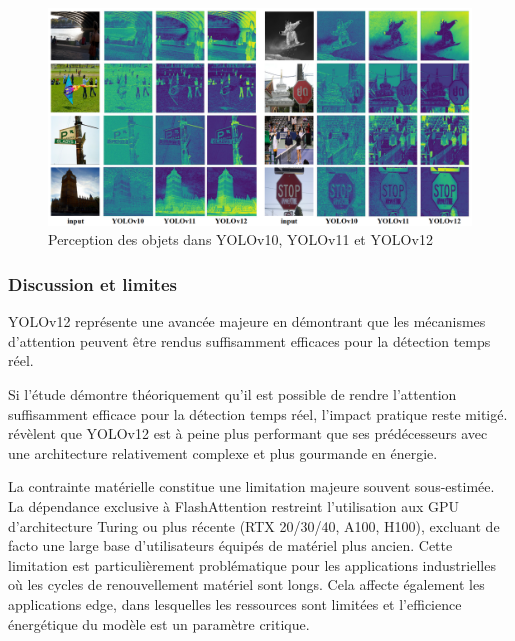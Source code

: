 \begin{figure}[H]
    \centering
    \includegraphics[width=1\linewidth]{02-main/figures/ch2/ch2_yolo_10_perception.png}
    \caption{Perception des objets dans YOLOv10, YOLOv11 et YOLOv12 \cite{tian_yolov12_2025}}
    \label{fig:ch2_yolo_10_perception}
\end{figure}

\subsubsection{Discussion et limites}
YOLOv12 représente une avancée majeure en démontrant que les mécanismes d'attention peuvent être rendus suffisamment efficaces pour la détection temps réel.

Si l'étude démontre théoriquement qu'il est possible de rendre l'attention suffisamment efficace pour la détection temps réel, l'impact pratique reste mitigé. \citeauthor{khanam_review_2025} \cite{khanam_review_2025} révèlent que YOLOv12 est à peine plus performant que ses prédécesseurs avec une architecture relativement complexe et plus gourmande en énergie.

La contrainte matérielle constitue une limitation majeure souvent sous-estimée. La dépendance exclusive à FlashAttention restreint l'utilisation aux GPU d'architecture Turing ou plus récente (RTX 20/30/40, A100, H100), excluant de facto une large base d'utilisateurs équipés de matériel plus ancien. Cette limitation est particulièrement problématique pour les applications industrielles où les cycles de renouvellement matériel sont longs. Cela affecte également les applications edge, dans lesquelles les ressources sont limitées et l'efficience énergétique du modèle est un paramètre critique.


